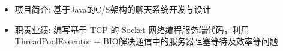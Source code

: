 \begin{itemize}[leftmargin=*]
{\begin{itemize}
        \item 项目简介: 基于Java的C/S架构的聊天系统开发与设计
        \item 职责业绩: 编写基于 TCP 的 Socket 网络编程服务端代码，利用ThreadPoolExecutor + BIO解决通信中的服务器阻塞等待及效率等问题
      \end{itemize}
      }
  \end{itemize}